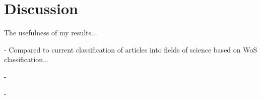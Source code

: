\chapter{Discussion}
\label{chapter:discussion}

The usefulness of my results...

- Compared to current classification of articles into fields of 
science based on WoS classification...

- 

- 


